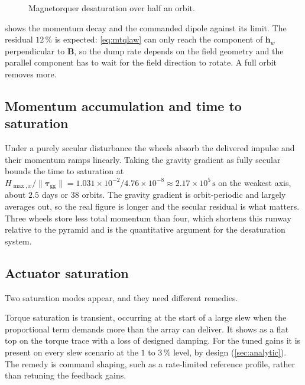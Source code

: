 \documentclass[conference,10pt,a4paper]{IEEEtran}
\newif\ifdraftmode
\newcommand{\figplaceholder}[2]{%
  \ifdraftmode
    \setlength{\fboxsep}{4pt}%
    \fbox{%
      \parbox[c][#1][c]{\dimexpr\linewidth-2\fboxsep-2\fboxrule\relax}{%
        \centering\scriptsize\textsc{figure placeholder}\\[3pt]
        \itshape #2}}%
  \else
    \parbox[c][#1][c]{\linewidth}{}%
  \fi}
\newcommand{\vect}[1]{\bm{#1}}
\newcommand{\unit}[1]{\ensuremath{\,\mathrm{#1}}}
\begin{document}
\begin{figure}[!t]
\centering
\figplaceholder{44mm}{Stored wheel momentum $\|\vect{h}_w\|$ falling over the
run with the engagement threshold marked, and commanded dipole against the
per-axis limit underneath. Generated by \texttt{deimos run --plots
wheel\_momentum,mtq\_dipole}.}
\caption{Magnetorquer desaturation over half an orbit.}
\label{fig:desat}
\end{figure}

 shows the momentum decay and the commanded dipole against its
limit. The residual $12\,\%$ is expected: \cref{eq:mtqlaw} can only reach the component
of $\vect{h}_w$ perpendicular to $\vect{B}$, so the dump rate depends on the
field geometry and the parallel component has to wait for the field direction to
rotate. A full orbit removes more.

\subsection{Momentum accumulation and time to saturation}

Under a purely secular disturbance the wheels absorb the delivered impulse and
their momentum ramps linearly. Taking the gravity gradient as fully secular
bounds the time to saturation at
$H_{\max,x}/\|\vect{\tau}_\text{gg}\| = 1.031\times10^{-2}/4.76\times10^{-8}
\approx 2.17\times10^{5}\unit{s}$ on the weakest axis, about $2.5$ days or 38
orbits. The gravity gradient is orbit-periodic and largely averages out, so the
real figure is longer and the secular residual is what matters. Three wheels
store less total momentum than four, which shortens this runway relative to the
pyramid and is the quantitative argument for the desaturation system.

\subsection{Actuator saturation}
\label{sec:saturation}

Two saturation modes appear, and they need different remedies.

Torque saturation is transient, occurring at the start of a large slew when the
proportional term demands more than the array can deliver. It shows as a flat
top on the torque trace with a loss of designed damping. For the tuned gains it
is present on every slew scenario at the $1$ to $3\,\%$ level, by design
(\cref{sec:analytic}). The remedy is command shaping, such as a rate-limited
reference profile, rather than retuning the feedback gains.
\end{document}
